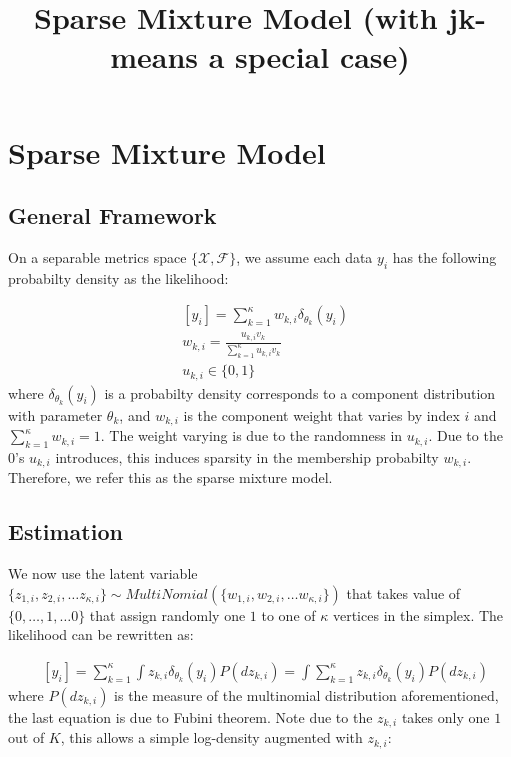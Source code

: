 \documentclass[12pt]{article}
\title
    {{Sparse Mixture Model (with jk-means a special case)}}
\date{}
\begin{document}
    
\maketitle


\section{Sparse Mixture Model}

\subsection{General Framework}

On a separable metrics space $\{\mathcal{X},\mathcal{F}\}$, we assume each data $y_i$ has the following probabilty density as the likelihood:

\begin{equation}
\begin{aligned}
& [ y_i ] = \sum_{k=1}^{\kappa} w_{k,i} \delta_{\theta_{k}}(y_i) \\
& w_{k,i} = \frac{ u_{k,i} v_{k} } { \sum_{k=1}^{\kappa}  u_{k,i} v_{k} }\\
& u_{k,i} \in \{0,1\}
\end{aligned}
\label{marginal_lik}
\end{equation}
where $\delta_{\theta_{k}}(y_i)$ is a probabilty density corresponds to a component distribution with parameter $\theta_{k}$, and $w_{k,i}$ is the component weight that varies by index $i$ and $\sum_{k=1}^{\kappa} w_{k,i} =1$. The weight varying is due to the randomness in $u_{k,i}$. Due to the $0$'s $u_{k,i}$ introduces, this induces sparsity in the membership probabilty $w_{k,i}$. Therefore, we refer this as the sparse mixture model.

\subsection{Estimation}

We now use the latent variable $\{ z_{1,i},z_{2,i},\ldots z_{\kappa,i} \} \sim MultiNomial (\{ w_{1,i},w_{2,i},\ldots w_{\kappa,i}\} )$ that takes value of $\{0,\ldots,1,\ldots 0\}$ that assign randomly one $1$ to one of $\kappa$ vertices in the simplex. The likelihood can be rewritten as:


\begin{equation}
\begin{aligned}
& [ y_i ] =   \sum_{k=1}^{\kappa} \int z_{k,i} \delta_{\theta_{k}}(y_i) P(d z_{k,i}) = \int \sum_{k=1}^{\kappa} z_{k,i} \delta_{\theta_{k}}(y_i) P(d z_{k,i})
\end{aligned}
\end{equation}
where $P(d z_{k,i})$ is the measure of the multinomial distribution aforementioned, the last equation is due to Fubini theorem. Note due to the $z_{k,i}$ takes only one $1$ out of $K$, this allows a simple log-density augmented with $z_{k,i}$:
\end{document}
